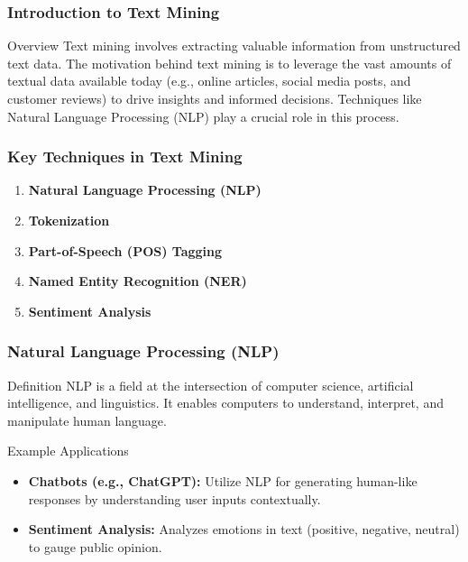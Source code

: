 \documentclass[aspectratio=169]{beamer}
\begin{document}
\begin{frame}[fragile]
    \frametitle{Introduction to Text Mining}
    \begin{block}{Overview}
        Text mining involves extracting valuable information from unstructured text data. The motivation behind text mining is to leverage the vast amounts of textual data available today (e.g., online articles, social media posts, and customer reviews) to drive insights and informed decisions. Techniques like Natural Language Processing (NLP) play a crucial role in this process.
    \end{block}
\end{frame}

\begin{frame}[fragile]
    \frametitle{Key Techniques in Text Mining}
    \begin{enumerate}
        \item \textbf{Natural Language Processing (NLP)}
        \item \textbf{Tokenization}
        \item \textbf{Part-of-Speech (POS) Tagging}
        \item \textbf{Named Entity Recognition (NER)}
        \item \textbf{Sentiment Analysis}
    \end{enumerate}
\end{frame}

\begin{frame}[fragile]
    \frametitle{Natural Language Processing (NLP)}
    \begin{block}{Definition}
        NLP is a field at the intersection of computer science, artificial intelligence, and linguistics. It enables computers to understand, interpret, and manipulate human language.
    \end{block}
    \begin{block}{Example Applications}
        \begin{itemize}
            \item \textbf{Chatbots (e.g., ChatGPT):} Utilize NLP for generating human-like responses by understanding user inputs contextually.
            \item \textbf{Sentiment Analysis:} Analyzes emotions in text (positive, negative, neutral) to gauge public opinion.
        \end{itemize}
    \end{block}
\end{frame}
\end{document}
